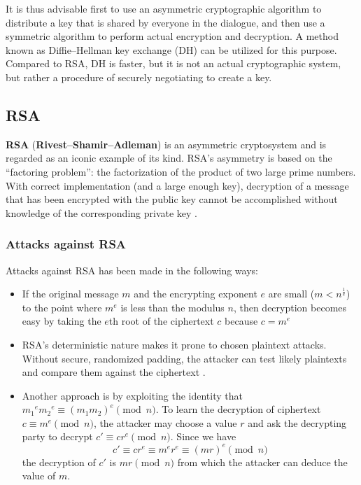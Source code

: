 \documentclass[letterpaper, twocolumn, 10pt, conference]{IEEEtran}
\newcommand{\term}[1]{\textbf{#1}}
\begin{document}
It is thus advisable first to use an asymmetric cryptographic algorithm to distribute a key that is shared by everyone in the dialogue, and then use a symmetric algorithm to perform actual encryption and decryption. A method known as Diffie--Hellman key exchange (DH) can be utilized for this purpose. Compared to RSA, DH is faster, but it is not an actual cryptographic system, but rather a procedure of securely negotiating to create a key.

\subsection{RSA} \label{ssec:rsa}

\term{RSA} (\term{Rivest--Shamir--Adleman}) is an asymmetric cryptosystem and is regarded as an iconic example of its kind. RSA's asymmetry is based on the \enquote{factoring problem}: the factorization of the product of two large prime numbers. With correct implementation (and a large enough key), decryption of a message that has been encrypted with the public key cannot be accomplished without knowledge of the corresponding private key \cite{rivest1978method}.

\subsubsection*{Attacks against RSA}

Attacks against RSA has been made in the following ways:

\begin{itemize}
	\item If the original message $m$ and the encrypting exponent $e$ are small ($ m < n^{\frac{1}{e}} $) to the point where $m^e$ is less than the modulus $n$, then decryption becomes easy by taking the $e$th root of the ciphertext $c$ because $ c = m^e $
	\item RSA's deterministic nature makes it prone to chosen plaintext attacks. Without secure, randomized padding, the attacker can test likely plaintexts and compare them against the ciphertext \cite{goldwasser1982probabilistic}.
	\item Another approach is by exploiting the identity that $ {m_1}^e {m_2}^e \equiv (m_1 m_2)^e \pmod{n} $. To learn the decryption of ciphertext $ c \equiv m^e \pmod{n} $, the attacker may choose a value $r$ and ask the decrypting party to decrypt $ c' \equiv cr^e \pmod{n} $. Since we have \[c' \equiv cr^e \equiv m^e r^e \equiv (mr)^e \pmod{n}\] the decryption of $c'$ is $ mr \pmod{n} $ from which the attacker can deduce the value of $m$.
\end{itemize}
\end{document}
